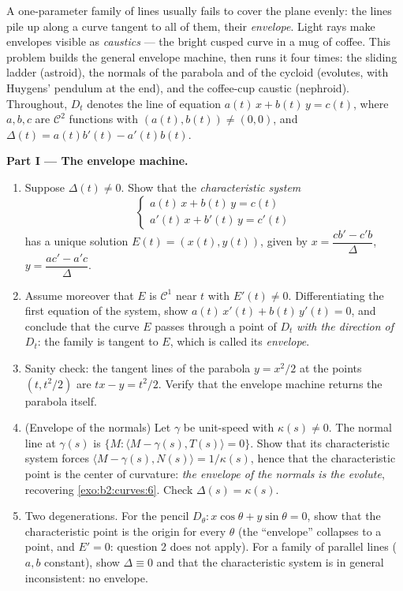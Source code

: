\begin{problem}\label{pb:b2:curves:1}
A one-parameter family of lines usually fails to cover the
plane evenly: the lines pile up along a curve tangent to all
of them, their \emph{envelope}. Light rays
make envelopes visible as \emph{caustics} --- the bright
cusped curve in a mug of coffee. This problem builds the
general envelope machine, then runs it four times: the sliding
ladder (astroid), the normals of the parabola and of the
cycloid (evolutes, with Huygens' pendulum at the end), and the
coffee-cup caustic (nephroid). Throughout, $D_t$ denotes the
line of equation $a(t)\,x + b(t)\,y = c(t)$, where $a, b, c$
are $\mathcal C^2$ functions with $(a(t), b(t)) \neq (0,0)$,
and $\Delta(t) = a(t)b'(t) - a'(t)b(t)$.

\medskip
\noindent\textbf{Part I --- The envelope machine.}
\begin{enumerate}
  \item Suppose $\Delta(t) \neq 0$. Show that the
        \emph{characteristic system}
        \[
        \begin{cases} a(t)\,x + b(t)\,y = c(t)\\
        a'(t)\,x + b'(t)\,y = c'(t)\end{cases}
        \]
        has a unique solution $E(t) = (x(t), y(t))$, given by
        $x = \dfrac{cb' - c'b}{\Delta}$, $y = \dfrac{ac' -
        a'c}{\Delta}$.
  \item Assume moreover that $E$ is $\mathcal C^1$ near $t$
        with $E'(t) \neq 0$. Differentiating the first
        equation of the system, show $a(t)\,x'(t) +
        b(t)\,y'(t) = 0$, and conclude that the curve $E$
        passes through a point of $D_t$ \emph{with the
        direction of} $D_t$: the family is tangent to $E$,
        which is called its \emph{envelope}.
  \item Sanity check: the tangent lines of the parabola $y =
        x^2/2$ at the points $(t, t^2/2)$ are $tx - y =
        t^2/2$. Verify that the envelope machine returns the
        parabola itself.
  \item (Envelope of the normals) Let $\gamma$ be unit-speed
        with $\kappa(s) \neq 0$. The normal line at
        $\gamma(s)$ is $\{M : \langle M - \gamma(s), T(s)
        \rangle = 0\}$. Show that its characteristic system
        forces $\langle M - \gamma(s), N(s)\rangle =
        1/\kappa(s)$, hence that the characteristic point is
        the center of curvature: \emph{the envelope of the
        normals is the evolute}, recovering
        \cref{exo:b2:curves:6}. Check $\Delta(s) =
        \kappa(s)$.
  \item Two degenerations. For the pencil $D_\theta : x\cos
        \theta + y\sin\theta = 0$, show that the
        characteristic point is the origin for every $\theta$
        (the ``envelope'' collapses to a point, and $E' = 0$:
        question 2 does not apply). For a family of parallel
        lines ($a, b$ constant), show $\Delta \equiv 0$ and
        that the characteristic system is in general
        inconsistent: no envelope.
\end{enumerate}


\end{problem}
